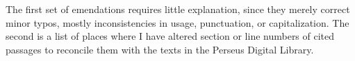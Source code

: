 
\label{emendations}
\markthird{}

\thispagestyle{dropfolio}


The first set of emendations requires little explanation, since they
merely correct minor typos, mostly inconsistencies in usage,
punctuation, or capitalization.  The second is a list of places where
I have altered section or line numbers of cited passages to reconcile
them with the texts in the Perseus Digital Library.

\medskip

